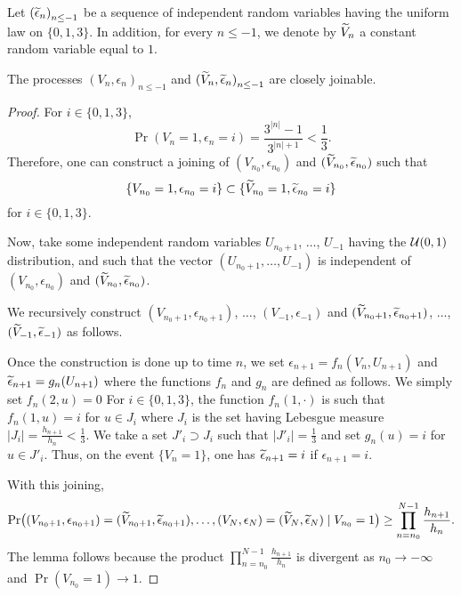 \documentclass[12pt,a4paper]{article}
\begin{document}
Let ${(\widetilde{\epsilon}_n)}_{n \leq -1}$ be a sequence of independent random 
variables having the uniform law on $\{0, 1, 3\}$. 
In addition, for every $n \leq -1$, we denote by $\widetilde{V}_n$ a constant 
random variable equal to $1$.

\begin{lemma}
The processes ${(V_n, \epsilon_n)}_{n \leq -1}$ and 
${(\widetilde{V}_n, \widetilde{\epsilon}_n)}_{n \leq -1}$ are closely joinable.
\end{lemma}

\begin{proof}
For $i \in \{0, 1, 3\}$, 
$$
\Pr(V_n=1, \epsilon_n=i) = \frac{3^{|n|}-1}{3^{|n|+1}} < \frac{1}{3}.
$$
Therefore, one can construct a joining of 
$(V_{n_0}, \epsilon_{n_0})$ and $(\widetilde{V}_{n_0},\widetilde{\epsilon}_{n_0})$ such that  
$$
\{V_{n_0}=1, \epsilon_{n_0}=i\} \subset \{\widetilde{V}_{n_0}=1,\widetilde{\epsilon}_{n_0} = i\} 
$$
for $i \in \{0,1,3\}$. 


Now, take some independent random variables $U_{n_0+1}$, $\ldots$, $U_{-1}$ 
having the $\mathcal{U}(0,1)$ distribution, and such that the vector $(U_{n_0+1}, \ldots, U_{-1})$ 
is independent of $(V_{n_0}, \epsilon_{n_0})$ and $(\widetilde{V}_{n_0},\widetilde{\epsilon}_{n_0})$. 

We recursively construct $(V_{n_0+1}, \epsilon_{n_0+1})$, $\ldots$, $(V_{-1}, \epsilon_{-1})$ 
and $(\widetilde{V}_{n_0+1}, \widetilde{\epsilon}_{n_0+1})$, $\ldots$, $(\widetilde{V}_{-1}, \widetilde{\epsilon}_{-1})$ 
as follows.

Once the construction is done up to time $n$, we set 
$\epsilon_{n+1} = f_n(V_n, U_{n+1})$ and $\widetilde{\epsilon}_{n+1} = g_n(U_{n+1})$ 
where the functions $f_n$ and $g_n$ are defined as follows. 
We simply set $f_n(2, u)=0$
For $i \in \{0,1,3\}$, the function $f_n(1, \cdot)$ is such that  
$f_n(1, u) = i$ for $u \in J_i$ 
where $J_i$ is the set having Lebesgue measure 
$|J_i| = \frac{h_{n+1}}{h_{n}} < \frac{1}{3}$. 
We take a set $J'_i \supset J_i$ such that $|J'_i|=\frac{1}{3}$ 
and set $g_n(u)=i$ for $u \in J'_i$. 
Thus, on the event $\{V_n=1\}$, one has $\widetilde{\epsilon}_{n+1}=i$ if $\epsilon_{n+1}=i$. 

With this joining, 
$$
\Pr\bigl((V_{n_0+1}, \epsilon_{n_0+1})=(\widetilde{V}_{n_0+1}, \widetilde{\epsilon}_{n_0+1}), 
\ldots, (V_N, \epsilon_{N})=(\widetilde{V}_{N},\widetilde{\epsilon}_{N}) 
\mid V_{n_0}=1 \bigr) \geq \prod_{n=n_0}^{N-1} \frac{h_{n+1}}{h_{n}}.  
$$
The lemma follows because the product $\prod_{n=n_0}^{N-1} \frac{h_{n+1}}{h_{n}}$ 
is divergent as  $n_0 \to -\infty$ and $\Pr(V_{n_0}=1) \to 1$. 
\end{proof}
\end{document}
